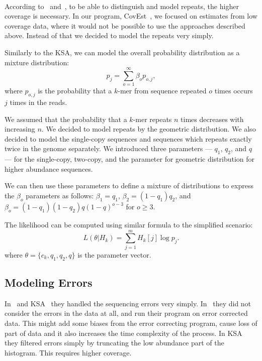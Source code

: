 \paragraph{} According to~\cite{waterman} and~\cite{williams}, to be able to distinguish and model repeats, the higher coverage is necessary. In our program, CovEst~\cite{covest}, we focused on estimates from low coverage data, where it would not be possible to use the approaches described above. Instead of that we decided to model the repeats very simply.

Similarly to the KSA, we can model the overall probability distribution as a mixture distribution:
$$p_j = \sum_{o=1}^\infty \beta_o p_{o,j},$$
where $p_{o,j}$ is the probability that a $k$-mer from sequence repeated $o$ times occurs $j$ times in the reads.

We assumed that the probability that a $k$-mer repeats $n$ times decreases with increasing $n$. We decided to model repeats by the geometric distribution. We also decided to model the single-copy sequences and sequences which repeats exactly twice in the genome separately. We introduced three parameters --- $q_1$, $q_2$, and $q$ --- for the single-copy, two-copy, and the parameter for geometric distribution for higher abundance sequences.

We can then use these parameters to define a mixture of distributions to express the $\beta_o$ parameters as follows:
$\beta_1 = q_1$, $\beta_2 = (1-q_1) q_2$, and $\beta_o =
(1-q_1)(1-q_2)q{(1-q)}^{o-3}$ for $o\ge 3$.

The likelihood can be computed using similar formula to the simplified scenario:
$$L(\theta | H_k) = \sum_{j=1}^m H_k[j] \log p_j.$$
where $\theta = \{c_k, q_1, q_2, q\}$ is the parameter vector.

\subsection{Modeling Errors}

In~\cite{waterman} and KSA~\cite{williams} they handled the sequencing errors very simply. In~\cite{waterman} they did not consider the errors in the data at all, and run their program on error corrected data. This might add some biases from the error correcting program, cause loss of part of data and it also increases the time complexity of the process. In KSA they filtered errors simply by truncating the low abundance part of the histogram. This requires higher coverage.

